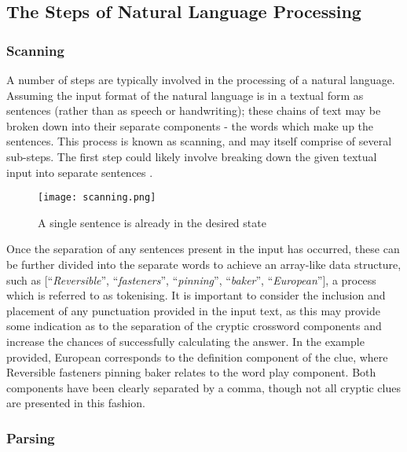 \newpage
\subsection{The Steps of Natural Language Processing}

\subsubsection{Scanning}

A number of steps are typically involved in the processing of a natural
language. Assuming the input format of the natural language is in a textual form
as sentences (rather than as speech or handwriting); these chains of text may be
broken down into their separate components - the words which make up the
sentences. This process is known as scanning, and may itself comprise of several
sub-steps. The first step could likely involve breaking down the given textual
input into separate sentences \citep{apache13}.

\begin{figure}[H]
	\centering
	\texttt{[image: scanning.png]}
	\caption{A single sentence is already in the desired state}
\end{figure}

Once the separation of any sentences present in the input has occurred, these
can be further divided into the separate words to achieve an array-like data
structure, such as [“\emph{Reversible}”, “\emph{fasteners}”, “\emph{pinning}”,
“\emph{baker}”, “\emph{European}”], a process which is referred to as
tokenising. It is important to consider the inclusion and placement of any
punctuation provided in the input text, as this may provide some indication as
to the separation of the cryptic crossword components  and increase the chances
of successfully calculating the answer. In the example provided, European
corresponds to the definition component of the clue, where Reversible fasteners
pinning baker relates to the word play component. Both components have been
clearly separated by a comma, though not all cryptic clues are presented in this
fashion.

\subsubsection{Parsing}

